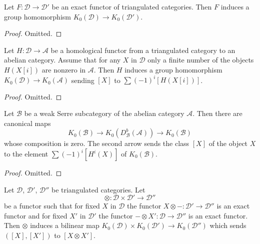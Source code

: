 \begin{lemma}
\label{lemma-map-K}
Let $F : \mathcal{D} \to \mathcal{D}'$ be an exact functor of triangulated
categories. Then $F$ induces a group homomorphism
$K_0(\mathcal{D}) \to K_0(\mathcal{D}')$.
\end{lemma}

\begin{proof}
Omitted.
\end{proof}

\begin{lemma}
\label{lemma-homological-map-K}
Let $H : \mathcal{D} \to \mathcal{A}$ be a homological functor
from a triangulated category to an abelian category. Assume that
for any $X$ in $\mathcal{D}$ only a finite number of the objects
$H(X[i])$ are nonzero in $\mathcal{A}$. Then $H$ induces a group homomorphism
$K_0(\mathcal{D}) \to K_0(\mathcal{A})$ sending $[X]$ to
$\sum (-1)^i[H(X[i])]$.
\end{lemma}

\begin{proof}
Omitted.
\end{proof}

\begin{lemma}
\label{lemma-DBA-map-K}
Let $\mathcal{B}$ be a weak Serre subcategory of the abelian category
$\mathcal{A}$. Then there are canonical maps
$$
K_0(\mathcal{B}) \longrightarrow
K_0(D^b_\mathcal{B}(\mathcal{A})) \longrightarrow
K_0(\mathcal{B})
$$
whose composition is zero. The second arrow
sends the class $[X]$ of the object $X$ to the element
$\sum (-1)^i[H^i(X)]$ of $K_0(\mathcal{B})$.
\end{lemma}

\begin{proof}
Omitted.
\end{proof}

\begin{lemma}
\label{lemma-bilinear-map-K}
Let $\mathcal{D}$, $\mathcal{D}'$, $\mathcal{D}''$ be triangulated categories.
Let
$$
\otimes : \mathcal{D} \times \mathcal{D}' \longrightarrow \mathcal{D}''
$$
be a functor such that for fixed $X$ in $\mathcal{D}$ the functor
$X \otimes - : \mathcal{D}' \to \mathcal{D}''$ is an exact functor and
for fixed $X'$ in $\mathcal{D}'$ the functor
$- \otimes X' : \mathcal{D} \to \mathcal{D}''$ is an exact functor. Then
$\otimes$ induces a bilinear map
$K_0(\mathcal{D}) \times K_0(\mathcal{D}') \to K_0(\mathcal{D}'')$
which sends $([X], [X'])$ to $[X \otimes X']$.
\end{lemma}

